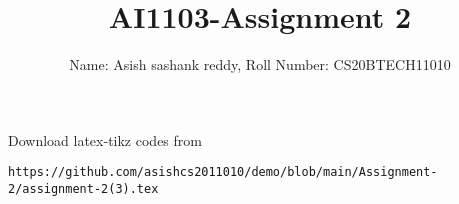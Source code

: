 \documentclass[journal,12pt,twocolumn]{IEEEtran}
\DeclareMathOperator*{\Res}{Res}
\begin{document}
\newcommand{\BEQA}{\begin{eqnarray}}
\newcommand{\EEQA}{\end{eqnarray}}
\newcommand{\define}{\stackrel{\triangle}{=}}

\raggedbottom
\setlength{\parindent}{0pt}
\providecommand{\mbf}{\mathbf}
\providecommand{\pr}[1]{\ensuremath{\Pr\left(#1\right)}}
\providecommand{\qfunc}[1]{\ensuremath{Q\left(#1\right)}}
\providecommand{\sbrak}[1]{\ensuremath{{}\left[#1\right]}}
\providecommand{\lsbrak}[1]{\ensuremath{{}\left[#1\right.}}
\providecommand{\rsbrak}[1]{\ensuremath{{}\left.#1\right]}}
\providecommand{\brak}[1]{\ensuremath{\left(#1\right)}}
\providecommand{\lbrak}[1]{\ensuremath{\left(#1\right.}}
\providecommand{\rbrak}[1]{\ensuremath{\left.#1\right)}}
\providecommand{\cbrak}[1]{\ensuremath{\left\{#1\right\}}}
\providecommand{\lcbrak}[1]{\ensuremath{\left\{#1\right.}}
\providecommand{\rcbrak}[1]{\ensuremath{\left.#1\right\}}}
\theoremstyle{remark}
\newtheorem{rem}{Remark}
\newcommand{\sgn}{\mathop{\mathrm{sgn}}}
\providecommand{\abs}[1]{\vert#1\vert}
\providecommand{\res}[1]{\Res\displaylimits_{#1}} 
\providecommand{\norm}[1]{\lVert#1\rVert}
\providecommand{\mtx}[1]{\mathbf{#1}}
\providecommand{\mean}[1]{E[ #1 ]}
\providecommand{\fourier}{\overset{\mathcal{F}}{ \rightleftharpoons}}
\providecommand{\system}{\overset{\mathcal{H}}{ \longleftrightarrow}}
\newcommand{\solution}{\noindent \textbf{Solution: }}
\newcommand{\cosec}{\,\text{cosec}\,}
\providecommand{\dec}[2]{\ensuremath{\overset{#1}{\underset{#2}{\gtrless}}}}
\newcommand{\myvec}[1]{\ensuremath{\begin{pmatrix}#1\end{pmatrix}}}
\newcommand{\mydet}[1]{\ensuremath{\begin{vmatrix}#1\end{vmatrix}}}
\makeatletter
{}
\makeatother
\let\StandardTheFigure\thefigure
\let\vec\mathbf
\renewcommand{\thefigure}{\theproblem}
\def\putbox#1#2#3{\makebox[0in][l]{\makebox[#1][l]{}\raisebox{\baselineskip}[0in][0in]{\raisebox{#2}[0in][0in]{#3}}}}
     \def\rightbox#1{\makebox[0in][r]{#1}}
     \def\centbox#1{\makebox[0in]{#1}}
     \def\topbox#1{\raisebox{-\baselineskip}[0in][0in]{#1}}
     \def\midbox#1{\raisebox{-0.5\baselineskip}[0in][0in]{#1}}
\vspace{3cm}
\title{AI1103-Assignment 2}
\author{Name: Asish sashank reddy, Roll Number: CS20BTECH11010}
\maketitle
\newpage
\bigskip
\renewcommand{\thefigure}{\theenumi}
\renewcommand{\thetable}{\theenumi}
Download latex-tikz codes from 
%
\begin{lstlisting}
https://github.com/asishcs2011010/demo/blob/main/Assignment-2/assignment-2(3).tex
\end{lstlisting}
\end{document}

